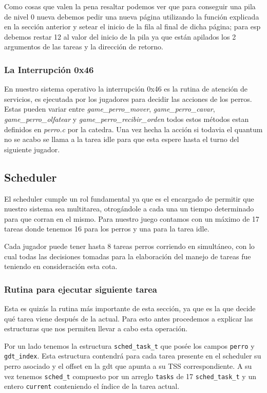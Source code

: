 Como cosas que valen la pena resaltar podemos ver que para conseguir una pila de nivel 0 nueva debemos pedir una nueva página utilizando la función explicada en la sección anterior y setear el inicio de la fila al final de dicha página; para esp debemos restar 12 al valor del inicio de la pila ya que están apilados los 2 argumentos de las tareas y la dirección de retorno.

\subsubsection{La Interrupción 0x46}
En nuestro sistema operativo la interrupción 0x46 es la rutina de atención de servicios, es ejecutada por los jugadores para decidir las acciones de los perros. Estas pueden variar entre  \textit{game\_perro\_mover}, \textit{game\_perro\_cavar}, \textit{game\_perro\_olfatear} y \textit{game\_perro\_recibir\_orden} todos estos métodos estan definidos en \textit{perro.c} por la catedra. Una vez hecha la acción si todavia el quantum no se acabo se llama a la tarea idle para que esta espere hasta el turno del siguiente jugador.

\subsection{Scheduler}
El scheduler cumple un rol fundamental ya que es el encargado de permitir que
nuestro sistema sea multitarea, otrogándole a cada una un tiempo determinado
para que corran en el mismo. Para nuestro juego contamos con un máximo de 17
tareas donde tenemos 16 para los perros y una para la tarea idle.

Cada jugador puede tener hasta 8 tareas perros corriendo en simultáneo, con lo
cual todas las decisiones tomadas para la elaboración del manejo de tareas fue
teniendo en consideración esta cota.

\subsubsection{Rutina para ejecutar siguiente tarea}

Esta es quizás la rutina más importante de esta sección, ya que es la que decide
qué tarea viene después de la actual. Para esto antes procedemos a explicar las
estructuras que nos permiten llevar a cabo esta operación.

Por un lado tenemos la estructura \texttt{sched\_task\_t} que posée los campos
\texttt{perro} y \texttt{gdt\_index}. Esta estructura contendrá para cada tarea
presente en el scheduler su perro asociado y el offset en la gdt que apunta a su
TSS correspondiente. A su vez tenemos \texttt{sched\_t} compuesto por un arreglo \texttt{tasks} de 17
\texttt{sched\_task\_t} y un entero \texttt{current} conteniendo el índice de la
tarea actual.

